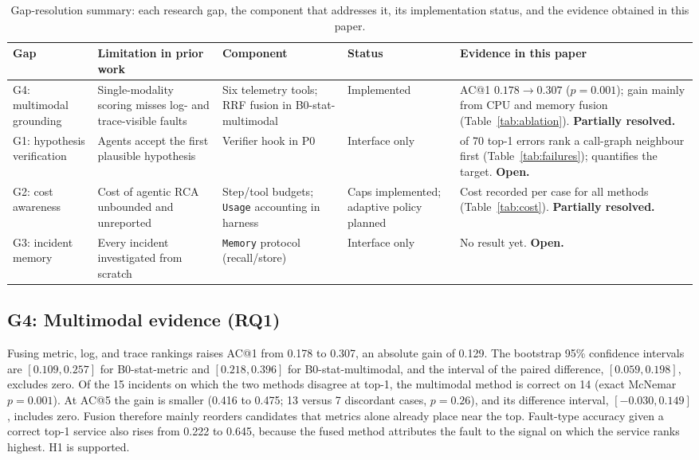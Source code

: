 \documentclass[conference]{IEEEtran}
\begin{document}
\begin{table}[t]
\centering
\caption{Gap-resolution summary: each research gap, the component that addresses it, its implementation status, and the evidence obtained in this paper.}
\label{tab:gaps}
\footnotesize
\begin{tabular}{@{}>{\raggedright\arraybackslash}p{2.5cm}>{\raggedright\arraybackslash}p{3.5cm}>{\raggedright\arraybackslash}p{3.1cm}>{\raggedright\arraybackslash}p{2.3cm}>{\raggedright\arraybackslash}p{4.8cm}@{}}
\toprule
\textbf{Gap} & \textbf{Limitation in prior work} & \textbf{Component} & \textbf{Status} & \textbf{Evidence in this paper} \\
\midrule
G4: multimodal grounding & Single-modality scoring misses log- and trace-visible faults & Six telemetry tools; RRF fusion in B0-stat-multimodal & Implemented & AC@1 $0.178\rightarrow0.307$ ($p=0.001$); gain mainly from CPU and memory fusion (Table~\ref{tab:ablation}). \textbf{Partially resolved.} \\
G1: hypothesis verification & Agents accept the first plausible hypothesis & Verifier hook in P0 & Interface only & 25 of 70 top-1 errors rank a call-graph neighbour first (Table~\ref{tab:failures}); quantifies the target. \textbf{Open.} \\
G2: cost awareness & Cost of agentic RCA unbounded and unreported & Step/tool budgets; \texttt{Usage} accounting in harness & Caps implemented; adaptive policy planned & Cost recorded per case for all methods (Table~\ref{tab:cost}). \textbf{Partially resolved.} \\
G3: incident memory & Every incident investigated from scratch & \texttt{Memory} protocol (recall/store) & Interface only & No result yet. \textbf{Open.} \\
\bottomrule
\end{tabular}
\end{table}

\subsection{G4: Multimodal evidence (RQ1)}
Fusing metric, log, and trace rankings raises AC@1 from 0.178 to 0.307, an absolute gain of 0.129. The bootstrap 95\% confidence intervals are $[0.109, 0.257]$ for B0-stat-metric and $[0.218, 0.396]$ for B0-stat-multimodal, and the interval of the paired difference, $[0.059, 0.198]$, excludes zero. Of the 15 incidents on which the two methods disagree at top-1, the multimodal method is correct on 14 (exact McNemar $p=0.001$). At AC@5 the gain is smaller (0.416 to 0.475; 13 versus 7 discordant cases, $p=0.26$), and its difference interval, $[-0.030, 0.149]$, includes zero. Fusion therefore mainly reorders candidates that metrics alone already place near the top. Fault-type accuracy given a correct top-1 service also rises from 0.222 to 0.645, because the fused method attributes the fault to the signal on which the service ranks highest. H1 is supported.
\end{document}
